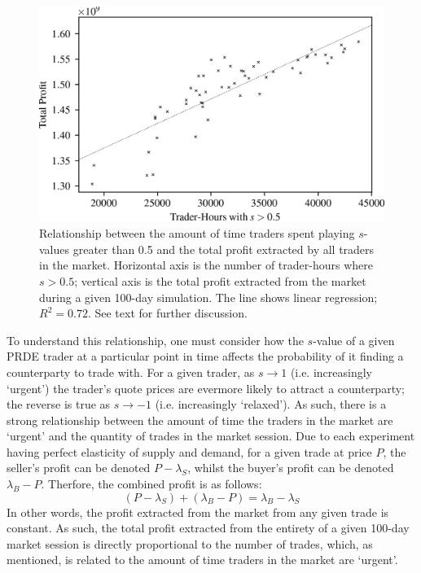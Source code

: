 \documentclass[conference]{IEEEtran}
\begin{document}
\begin{figure}[htbp]
    \centerline{\includegraphics[width=\columnwidth]{strategy_profit.png}}
    \caption{
        Relationship between the amount of time traders spent playing $s$-values greater than 0.5 and the total profit extracted by all traders in the market.
        Horizontal axis is the number of trader-hours where $s>0.5$; vertical axis is the total profit extracted from the market during a given 100-day simulation.
        The line shows linear regression; $R^2=0.72$.
        See text for further discussion.
    }
    \label{strategy_profit}
\end{figure}

To understand this relationship, one must consider how the $s$-value of a given PRDE trader at a particular point in time affects the probability of it finding a counterparty to trade with.
For a given trader, as $s\to1$ (i.e. increasingly `urgent') the trader's quote prices are evermore likely to attract a counterparty; the reverse is true as $s\to-1$ (i.e. increasingly `relaxed').
As such, there is a strong relationship between the amount of time the traders in the market are `urgent' and the quantity of trades in the market session.
Due to each experiment having perfect elasticity of supply and demand, for a given trade at price $P$, the seller's profit can be denoted $P-\lambda_S$, whilst the buyer's profit can be denoted $\lambda_B-P$.
Therfore, the combined profit is as follows:
\[
  (P-\lambda_S) + (\lambda_B-P)=\lambda_B-\lambda_S
\]
In other words, the profit extracted from the market from any given trade is constant.
As such, the total profit extracted from the entirety of a given 100-day market session is directly proportional to the number of trades, which, as mentioned, is related to the amount of time traders in the market are `urgent'.
\end{document}
